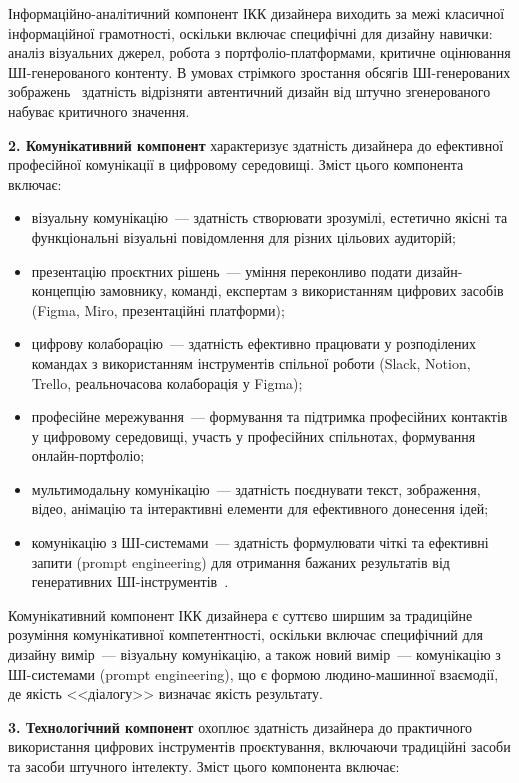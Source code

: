 Інформаційно-аналітичний компонент ІКК дизайнера виходить за межі класичної інформаційної грамотності, оскільки включає специфічні для дизайну навички: аналіз візуальних джерел, робота з портфоліо-платформами, критичне оцінювання ШІ-генерованого контенту. В умовах стрімкого зростання обсягів ШІ-генерованих зображень~\cite{Musiienko2026ScopingReview} здатність відрізняти автентичний дизайн від штучно згенерованого набуває критичного значення.

\textbf{2. Комунікативний компонент} характеризує здатність дизайнера до ефективної професійної комунікації в цифровому середовищі. Зміст цього компонента включає:

\begin{itemize}
    \item візуальну комунікацію~--- здатність створювати зрозумілі, естетично якісні та функціональні візуальні повідомлення для різних цільових аудиторій;
    \item презентацію проєктних рішень~--- уміння переконливо подати дизайн-концепцію замовнику, команді, експертам з використанням цифрових засобів (Figma, Miro, презентаційні платформи);
    \item цифрову колаборацію~--- здатність ефективно працювати у розподілених командах з використанням інструментів спільної роботи (Slack, Notion, Trello, реальночасова колаборація у Figma);
    \item професійне мережування~--- формування та підтримка професійних контактів у цифровому середовищі, участь у професійних спільнотах, формування онлайн-портфоліо;
    \item мультимодальну комунікацію~--- здатність поєднувати текст, зображення, відео, анімацію та інтерактивні елементи для ефективного донесення ідей;
    \item комунікацію з ШІ-системами~--- здатність формулювати чіткі та ефективні запити (prompt engineering) для отримання бажаних результатів від генеративних ШІ-інструментів~\cite{Musiienko2026ScopingReview}.
\end{itemize}

Комунікативний компонент ІКК дизайнера є суттєво ширшим за традиційне розуміння комунікативної компетентності, оскільки включає специфічний для дизайну вимір~--- візуальну комунікацію, а також новий вимір~--- комунікацію з ШІ-системами (prompt engineering), що є формою людино-машинної взаємодії, де якість <<діалогу>> визначає якість результату.

\textbf{3. Технологічний компонент} охоплює здатність дизайнера до практичного використання цифрових інструментів проєктування, включаючи традиційні засоби та засоби штучного інтелекту. Зміст цього компонента включає:

